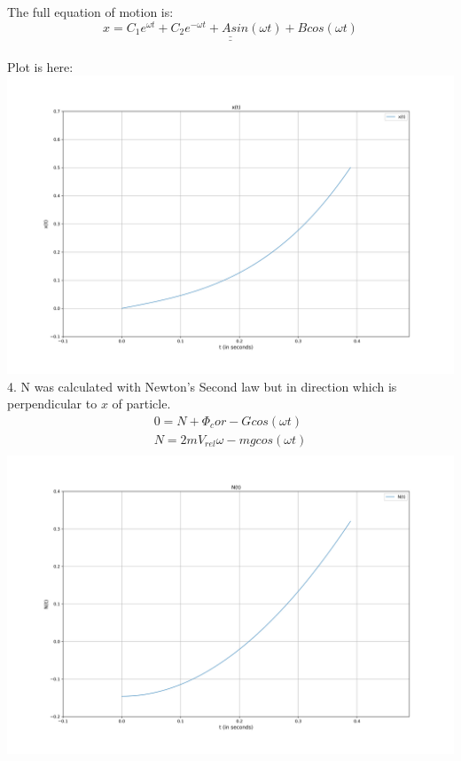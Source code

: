 \documentclass[a4paper,11pt,oneside,article]{memoir}
\def\doubleunderline#1{\underline{\underline{#1}}}
\begin{document}
The full equation of motion is:
\begin{equation}
    \doubleunderline{ x = C_1 e^{\omega t} +  C_2 e^{-\omega t} + A sin(\omega t)+ B cos(\omega t)}
\end{equation}\\
Plot is here:\\ 
\includegraphics[width=14cm]{images/task2x.png}\\
4. N was calculated with Newton's Second law but in direction which is perpendicular to $x$ of particle.\\
\begin{equation}
    \begin{split}
        0 = N + \Phi_cor - Gcos(\omega t)\\ 
        N =  2mV_{rel}\omega - mgcos(\omega t)\\
    \end{split}
\end{equation}
\includegraphics[width=14cm]{images/task2n.png}\\
\end{document}
